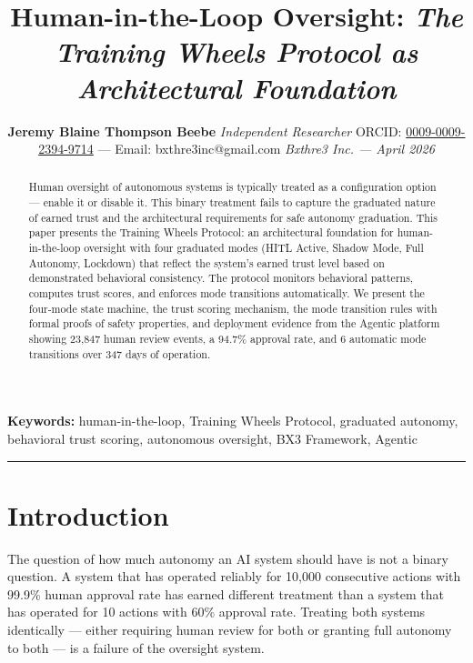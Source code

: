 \documentclass[12pt]{article}
\title{
    \vspace{1.2cm}
    {\LARGE \textbf{Human-in-the-Loop Oversight:}} \break
    {\large \textit{The Training Wheels Protocol as Architectural Foundation}}
}
\author{
    \textbf{Jeremy Blaine Thompson Beebe} \break
    \textit{Independent Researcher} \break
    ORCID: \href{https://orcid.org/0009-0009-2394-9714}{0009-0009-2394-9714} --- Email: bxthre3inc@gmail.com \break
    \textit{Bxthre3 Inc. --- April 2026}
}
\begin{document}
\maketitle
\thispagestyle{fancy}

\begin{abstract}\noindent
Human oversight of autonomous systems is typically treated as a configuration option --- enable it or disable it. This binary treatment fails to capture the graduated nature of earned trust and the architectural requirements for safe autonomy graduation. This paper presents the Training Wheels Protocol: an architectural foundation for human-in-the-loop oversight with four graduated modes (HITL Active, Shadow Mode, Full Autonomy, Lockdown) that reflect the system's earned trust level based on demonstrated behavioral consistency. The protocol monitors behavioral patterns, computes trust scores, and enforces mode transitions automatically. We present the four-mode state machine, the trust scoring mechanism, the mode transition rules with formal proofs of safety properties, and deployment evidence from the Agentic platform showing 23,847 human review events, a 94.7\% approval rate, and 6 automatic mode transitions over 347 days of operation.
\end{abstract}

\vspace{0.5em}
\noindent\textbf{Keywords:} human-in-the-loop, Training Wheels Protocol, graduated autonomy, behavioral trust scoring, autonomous oversight, BX3 Framework, Agentic

\vspace{1em}
\hrule
\vspace{1em}

\onehalfspacing

\section{Introduction}
\label{sec:intro}

The question of how much autonomy an AI system should have is not a binary question. A system that has operated reliably for 10,000 consecutive actions with 99.9\% human approval rate has earned different treatment than a system that has operated for 10 actions with 60\% approval rate. Treating both systems identically --- either requiring human review for both or granting full autonomy to both --- is a failure of the oversight system.
\end{document}
